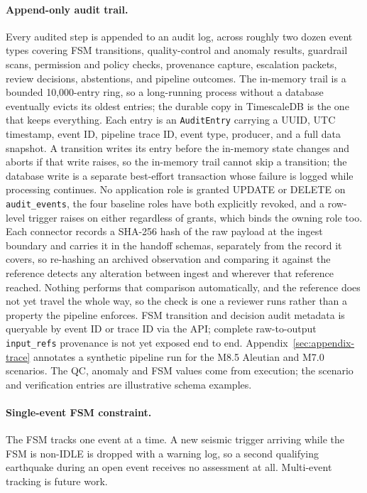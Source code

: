 \documentclass{article}
\begin{document}
\paragraph{Append-only audit trail.}
\label{sec:audit}
Every audited step is appended to an audit log, across roughly two
dozen event types covering FSM transitions, quality-control and
anomaly results, guardrail scans, permission and policy checks,
provenance capture, escalation packets, review decisions, abstentions,
and pipeline outcomes.  The in-memory trail is a bounded
10{,}000-entry ring, so a long-running process without a database
eventually evicts its oldest entries; the durable copy in TimescaleDB
is the one that keeps everything.  Each entry is an \texttt{AuditEntry} carrying a UUID,
UTC timestamp, event ID, pipeline trace ID, event type, producer, and
a full data snapshot. A transition writes its entry before the
in-memory state changes and aborts if that write raises, so the
in-memory trail cannot skip a transition; the database write is a
separate best-effort transaction whose failure is logged while
processing continues.
No application role is granted UPDATE or DELETE on
\texttt{audit\_events}, the four baseline roles have both explicitly
revoked, and a row-level trigger raises on either regardless of
grants, which binds the owning role too. Each connector records a SHA-256 hash of the raw payload at the ingest
boundary and carries it in the handoff schemas, separately from the
record it covers, so re-hashing an archived observation and comparing
it against the reference detects any alteration between ingest and
wherever that reference reached.  Nothing performs that comparison
automatically, and the reference does not yet travel the whole way, so
the check is one a reviewer runs rather than a property the pipeline
enforces. FSM transition and decision audit metadata is queryable by event ID or trace
ID via the API; complete raw-to-output \texttt{input\_refs} provenance is not
yet exposed end to end.
Appendix~\ref{sec:appendix-trace} annotates a synthetic pipeline run
for the M8.5 Aleutian and M7.0 scenarios.  The QC, anomaly and FSM
values come from execution; the scenario and verification entries are
illustrative schema examples.

\paragraph{Single-event FSM constraint.}
The FSM tracks one event at a time. A new seismic trigger arriving
while the FSM is non-IDLE is dropped with a warning log, so a second
qualifying earthquake during an open event receives no assessment at
all. Multi-event tracking is future work.
\end{document}
